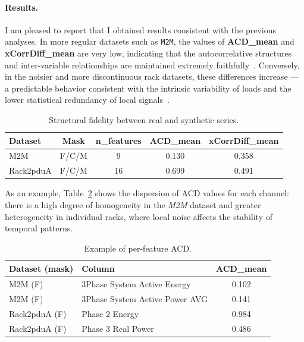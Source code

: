 \paragraph{Results.}
I am pleased to report that I obtained results consistent with the previous analyses.  
In more regular datasets such as \texttt{M2M}, the values of \textbf{ACD\_mean} and \textbf{xCorrDiff\_mean} are very low, indicating that the autocorrelative structures and inter-variable relationships are maintained extremely faithfully~\cite{box2015time,shumway2017time}.  
Conversely, in the noisier and more discontinuous rack datasets, these differences increase — a predictable behavior consistent with the intrinsic variability of loads and the lower statistical redundancy of local signals~\cite{wang2013experimental}.

\begin{table}[H]
\centering
\caption{Structural fidelity between real and synthetic series.}
\vspace{1mm}
{\small
\begin{tabular}{| l | c | c | c | c |}
\hline
\rowcolor[HTML]{F87C58}
\textbf{Dataset} & \textbf{Mask} & \textbf{n\_features} & \textbf{ACD\_mean} & \textbf{xCorrDiff\_mean} \\
\hline
\rowcolor[HTML]{FDE5DC}
M2M       & F/C/M & 9  & 0.130 & 0.358 \\ \hline
\rowcolor[HTML]{FFF4EE}
Rack2pduA & F/C/M & 16 & 0.699 & 0.491 \\ \hline
\end{tabular}
}
\label{tab:acd_xcorr_summary_2}
\end{table}

As an example, Table~\ref{tab:acd_per_feature_examples} shows the dispersion of ACD values for each channel: there is a high degree of homogeneity in the \emph{M2M} dataset and greater heterogeneity in individual racks, where local noise affects the stability of temporal patterns.

\begin{table}[H]
\centering
\caption{Example of per-feature ACD.}
\vspace{1mm}
{\small
\begin{tabular}{| l | l | c |}
\hline
\rowcolor[HTML]{F87C58}
\textbf{Dataset (mask)} & \textbf{Column} & \textbf{ACD\_mean} \\
\hline
\rowcolor[HTML]{FDE5DC}
M2M (F) & 3Phase System Active Energy & 0.102 \\ \hline
\rowcolor[HTML]{FFF4EE}
M2M (F) & 3Phase System Active Power AVG & 0.141 \\ \hline
\rowcolor[HTML]{FDE5DC}
Rack2pduA (F) & Phase 2 Energy & 0.984 \\ \hline
\rowcolor[HTML]{FFF4EE}
Rack2pduA (F) & Phase 3 Real Power & 0.486 \\ \hline
\end{tabular}
}
\label{tab:acd_per_feature_examples}
\end{table}

